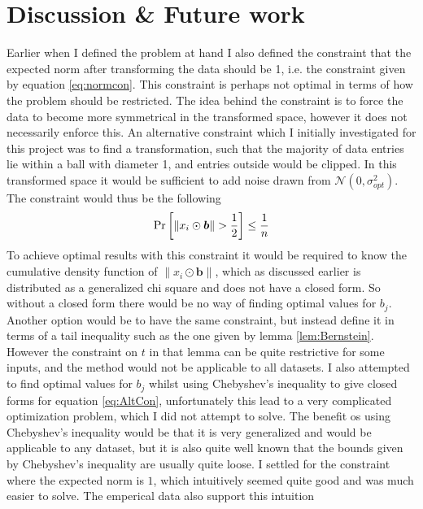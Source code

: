 \documentclass[a4paper,12pt]{article}
\begin{document}
\section{Discussion \& Future work}
Earlier when I defined the problem at hand I also defined the constraint that the expected norm after 
transforming the data should be 1, i.e. the constraint given by equation \eqref{eq:normcon}. 
This constraint is perhaps not optimal in terms of how the problem should be restricted. The idea behind the constraint
is to force the data to become more symmetrical in the transformed space, however it does not necessarily enforce this. 
An alternative constraint which I initially investigated for this project was to find a transformation, such that the majority of 
data entries lie within a ball with diameter 1, and entries outside would be clipped.
In this transformed space it would be sufficient to add noise drawn from
$\mathcal{N}(0, \sigma_{opt}^2)$. The constraint would thus be the following
\begin{equation}
\label{eq:AltCon}
    \Pr\left [ \| x_i \odot \bm{b} \| > \frac{1}{2} \right] \le \frac{1}{n} 
\end{equation}
To achieve optimal results with this constraint it would be required to know the cumulative density function of $\| x_i \odot \bm{b} \|$, 
which as discussed earlier is distributed as a generalized chi square and does not have a closed form. 
So without a closed form there would be no way of finding optimal values for $b_j$. 
Another option would be to have the same constraint, but instead define it in terms of a tail inequality such as the one
given by lemma \ref{lem:Bernstein}. However the constraint on $t$ in that lemma can be quite restrictive for some inputs, 
and the method would not be applicable to all datasets.
I also attempted to find optimal values for $b_j$ whilst using Chebyshev's inequality to give closed forms for equation \eqref{eq:AltCon}, 
unfortunately this lead to a very complicated optimization problem, which I did not attempt to solve.
The benefit os using Chebyshev's inequality would be that it is very generalized and would be applicable to any dataset, 
but it is also quite well known that the bounds given by Chebyshev's inequality are usually quite loose. 
I settled for the constraint where the expected norm is $1$, which intuitively seemed quite good and was much easier to solve. 
The emperical data also support this intuition \\
\end{document}
